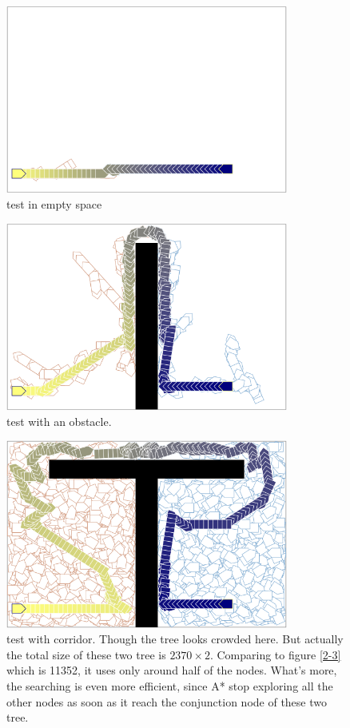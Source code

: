 \documentclass{article}
\begin{document}
\begin{figure}[!h]
\centering
\includegraphics[width=0.827\textwidth]{3-0.png}
\caption{test in empty space}
\label{3-0}
\end{figure}

\begin{figure}[!h]
\centering
\includegraphics[width=0.827\textwidth]{3-1.png}
\caption{test with an obstacle.}
\label{3-1}
\end{figure}

\begin{figure}[!h]
\centering
\includegraphics[width=0.827\textwidth]{3-2.png}
\caption{test with corridor. Though the tree looks crowded here. But actually the total size of these two tree is $2370\times2$. Comparing to figure \ref{2-3} which is 11352, it uses only around half of the nodes. What's more, the searching is even more efficient, since A* stop exploring all the other nodes as soon as it reach the conjunction node of these two tree.}
\label{3-2}
\end{figure}
\end{document}

